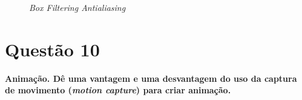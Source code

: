 \documentclass[12pt]{exam}
\begin{document}
\begin{enumerate}[label=\alph*)]
    \begin{figure}[H]
        \centering
        \qquad
        \caption{\textit{Box Filtering Antialiasing}}
        \label{fig:11}
    \end{figure}

\end{enumerate}

\section*{Questão 10}
{\bfseries Animação. Dê uma vantagem e uma desvantagem do uso da captura de movimento (\textit{motion capture}) para criar animação.}
\end{document}
